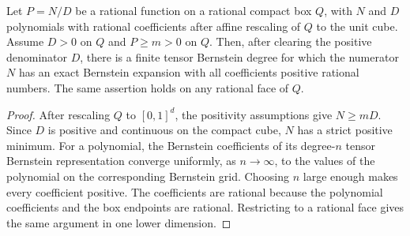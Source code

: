 \begin{lemma}\label{lem:StrictBernsteinElevation}
Let $P=N/D$ be a rational function on a rational compact box $Q$, with $N$ and
$D$ polynomials with rational coefficients after affine rescaling of $Q$ to the
unit cube.  Assume $D>0$ on $Q$ and $P\ge m>0$ on $Q$.  Then, after clearing the
positive denominator $D$, there is a finite tensor Bernstein degree for which
the numerator $N$ has an exact Bernstein expansion with all coefficients
positive rational numbers.  The same assertion holds on any rational face of
$Q$.
\end{lemma}

\begin{proof}
After rescaling $Q$ to $[0,1]^d$, the positivity assumptions give
$N\ge mD$.  Since $D$ is positive and continuous on the compact cube, $N$ has a
strict positive minimum.  For a polynomial, the Bernstein coefficients of its
degree-$n$ tensor Bernstein representation converge uniformly, as
$n\to\infty$, to the values of the polynomial on the corresponding Bernstein
grid.  Choosing $n$ large enough makes every coefficient positive.  The
coefficients are rational because the polynomial coefficients and the box
endpoints are rational.  Restricting to a rational face gives the same argument
in one lower dimension.
\end{proof}

